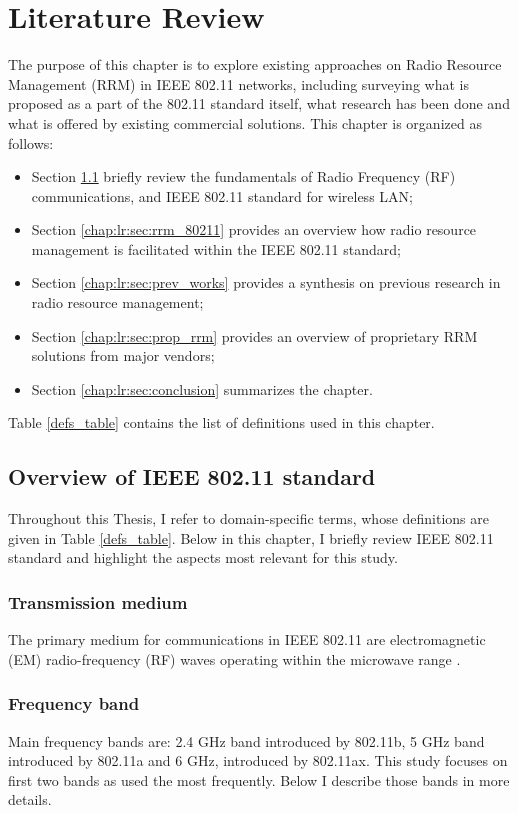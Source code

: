 \chapter{Literature Review}
\label{chap:lr}
\chaptermark{}
The purpose of this chapter is to explore existing approaches on Radio Resource Management (RRM) in IEEE 802.11 networks, including surveying what is proposed as a part of the 802.11 standard itself, what research has been done and what is offered by existing commercial solutions. This chapter is organized as follows:
\begin{itemize}
    \item Section \ref{chap:lr:sec:80211_overview} briefly review the fundamentals of Radio Frequency (RF) communications, and IEEE 802.11 standard for wireless LAN;
    \item Section \ref{chap:lr:sec:rrm_80211} provides an overview how radio resource management is facilitated within the IEEE 802.11 standard;
    \item Section \ref{chap:lr:sec:prev_works} provides a synthesis on previous research in radio resource management;
    \item Section \ref{chap:lr:sec:prop_rrm} provides an overview of proprietary RRM solutions from major vendors;
    \item Section \ref{chap:lr:sec:conclusion} summarizes the chapter.
\end{itemize}
Table \ref{defs_table} contains the list of definitions used in this chapter.

\section{Overview of IEEE 802.11 standard}
\label{chap:lr:sec:80211_overview}

Throughout this Thesis, I refer to domain-specific terms, whose definitions are given in Table \ref{defs_table}. Below in this chapter, I briefly review IEEE 802.11 standard and highlight the aspects most relevant for this study.


\subsection{Transmission medium}

The primary medium for communications in IEEE 802.11 are electromagnetic (EM) radio-frequency (RF) waves operating within the microwave range \cite{colemanCWNACertifiedWireless2021}.

\subsection{Frequency band}
Main frequency bands are: 2.4 GHz band introduced by 802.11b, 5 GHz band introduced by 802.11a and 6 GHz, introduced by 802.11ax. This study focuses on first two bands as used the most frequently. Below I describe those bands in more details.

